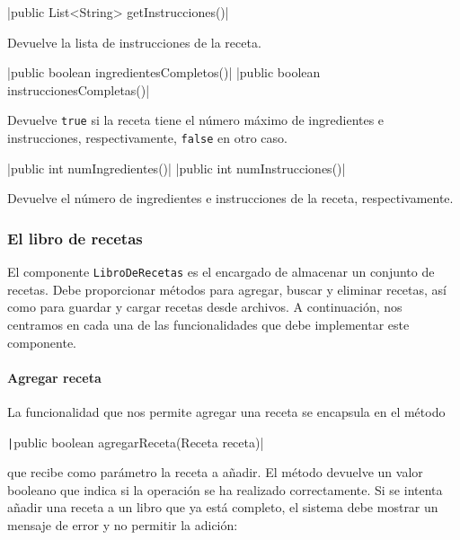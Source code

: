 \documentclass[
    a4paper, %
    12pt, %
]{CSSullivanBusinessReport}
\begin{document}
|public List<String> getInstrucciones()|

Devuelve la lista de instrucciones de la receta.

|public boolean ingredientesCompletos()|
|public boolean instruccionesCompletas()|

Devuelve \texttt{true} si la receta tiene el número máximo de ingredientes e instrucciones, respectivamente, \texttt{false} en otro caso.

|public int numIngredientes()|
|public int numInstrucciones()|

Devuelve el número de ingredientes e instrucciones de la receta, respectivamente.



\subsubsection{El libro de recetas}\label{sec:libro-recetas}

El componente \texttt{LibroDeRecetas} es el encargado de almacenar un conjunto de recetas. Debe proporcionar métodos para agregar, buscar y eliminar recetas, así como para guardar y cargar recetas desde archivos. A continuación, nos centramos en cada una de las funcionalidades que debe implementar este componente.

\paragraph{Agregar receta}

La funcionalidad que nos permite agregar una receta se encapsula en el método

\texttt|public boolean agregarReceta(Receta receta)|

que recibe como parámetro la receta a añadir. El método devuelve un valor booleano que indica si la operación se ha realizado correctamente. Si se intenta añadir una receta a un libro que ya está completo, el sistema debe mostrar un mensaje de error y no permitir la adición:

\end{document}
